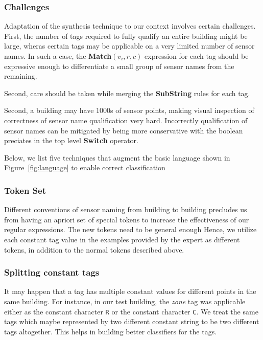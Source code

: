 \subsubsection{Challenges}

Adaptation of the synthesis technique to our context involves certain challenges. First, the number of tags required to fully qualify an entire building might be large, wheras certain tags may be applicable on a very limited number of sensor names. In such a case, the {\bf Match}$(v_i,r,c)$ expression for each tag should be expressive enough to differentiate a small group of sensor names from the remaining. 

Second, care should be taken while merging the {\bf SubString} rules for each tag. 

Second, a building may have 1000s of sensor points, making visual inspection of correctness of sensor name qualification very hard. Incorrectly qualification of sensor names can be mitigated by being more conservative with the boolean preciates in the top level {\bf Switch} operator. 

Below, we list five techniques that augment the basic language shown in Figure~\ref{fig:language} to enable correct classification 

\subsubsection{Token Set}

Different conventions of sensor naming from building to building precludes us from having an apriori set of special tokens to increase the effectiveness of our regular expressions. The new tokens need to be general enough Hence, we utilize  each constant tag value in the examples provided by the expert as different tokens, in addition to the normal tokens described above. 

\subsubsection{Splitting constant tags}

It may happen that a tag has multiple constant values for different points in the same building. For instance, in our test building, the {\it zone} tag was applicable either as the constant character \texttt{R} or the constant character \texttt{C}. We treat the same tags which maybe represented by two different constant string to be two different tags altogether. This helps in building better classifiers for the tags.

